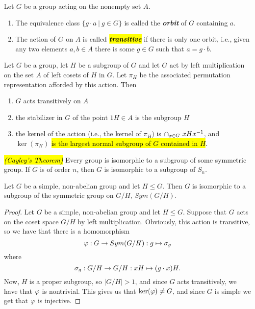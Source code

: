 \nl

\begin{defn}
Let $G$ be a group acting on the nonempty set $A$.
\begin{enumerate}
\item The equivalence class $\{g\cdot a\ |\ g\in G\}$ is called the \textbf{\textit{orbit}} of $G$ containing $a$.
\item The action of $G$ on $A$ is called \hl{\textbf{\textit{transitive}}} if there is only one orbit, i.e., given any two elements $a,b\in A$ there is some $g\in G$ such that $a= g\cdot b$.
\end{enumerate}
\end{defn}

\nl


\begin{thm}
Let $G$ be a group, let $H$ be a subgroup of $G$ and let $G$ act by left multiplication on the set $A$ of left cosets of $H$ in $G$. Let $\pi_H$ be the associated permutation representation afforded by this action. Then
\begin{enumerate}
\item $G$ acts transitively on $A$
\item the stabilizer in $G$ of the point $1H\in A$ is the subgroup $H$
\item the kernel of the action (i.e., the kernel of $\pi_H$) is $\cap_{x\in G}\ xHx^{-1}$, and $\ker(\pi_H)$ \hl{is the largest normal subgroup of $G$ contained in $H$}.
\end{enumerate}
\end{thm}

\nl

\begin{cor}\hl{\textit{(Cayley's Theorem)}}
Every group is isomorphic to a subgroup of some symmetric group. If $G$ is of order $n$, then $G$ is isomorphic to a subgroup of $S_n$.
\end{cor}

\nl

\begin{cor}
Let $G$ be a simple, non-abelian group and let $H\leq G$. Then $G$ is isomorphic to a subgroup of the symmetric group on $G/H$, $Sym(G/H)$.
\end{cor}

\begin{proof}
Let $G$ be a simple, non-abelian group and let $H\leq G$. Suppose that $G$ acts on the coset space $G/H$ by left multiplication. Obviously, this action is transitive, so we have that there is a homomorphism
\[\varphi:G \rightarrow Sym(G/H): g\mapsto \sigma_g\]
where
\[\sigma_g: G/H \rightarrow G/H: xH\mapsto (g\cdot x)H.\]
Now, $H$ is a proper subgroup, so $|G/H| > 1$, and since $G$ acts transitively, we have that $\varphi$ is nontrivial. This gives us that $\ker(\varphi) \neq G$, and since $G$ is simple we get that $\varphi$ is injective.
\end{proof}

